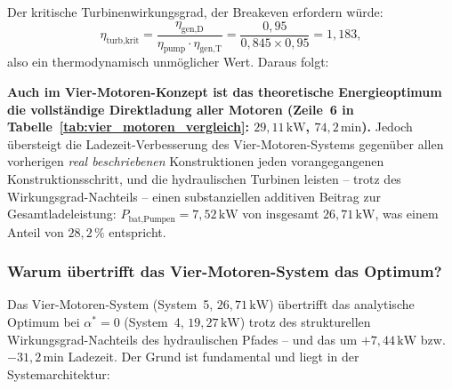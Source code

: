 ﻿\documentclass[a4paper,12pt]{article}
\begin{document}
Der kritische Turbinenwirkungsgrad, der Breakeven erfordern würde:
\begin{equation}
  \eta_\text{turb,krit}
    = \frac{\eta_\text{gen,D}}{\eta_\text{pump} \cdot \eta_\text{gen,T}}
    = \frac{0{,}95}{0{,}845 \times 0{,}95}
    = 1{,}183,
  \label{eq:eta_turb_krit_4mot}
\end{equation}
also ein thermodynamisch unmöglicher Wert. Daraus folgt:

\textbf{Auch im Vier-Motoren-Konzept ist das theoretische Energieoptimum
die vollständige Direktladung aller Motoren (Zeile~6 in
Tabelle~\ref{tab:vier_motoren_vergleich}: $29{,}11\,\text{kW}$,
$74{,}2\,\text{min}$).} Jedoch übersteigt die Ladezeit-Verbesserung
des Vier-Motoren-Systems gegenüber allen vorherigen \textit{real
beschriebenen} Konstruktionen jeden vorangegangenen Konstruktionsschritt,
und die hydraulischen Turbinen leisten -- trotz des Wirkungsgrad-Nachteils
-- einen substanziellen additiven Beitrag zur Gesamtladeleistung:
$P_\text{bat,Pumpen} = 7{,}52\,\text{kW}$ von insgesamt
$26{,}71\,\text{kW}$, was einem Anteil von $28{,}2\,\%$ entspricht.

\subsubsection{Warum übertrifft das Vier-Motoren-System das Optimum?}

Das Vier-Motoren-System (System~5, $26{,}71\,\text{kW}$) übertrifft
das analytische Optimum bei $\alpha^* = 0$
(System~4, $19{,}27\,\text{kW}$) trotz des strukturellen
Wirkungsgrad-Nachteils des hydraulischen Pfades -- und das um
$+7{,}44\,\text{kW}$ bzw.\ $-31{,}2\,\text{min}$ Ladezeit.
Der Grund ist fundamental und liegt in der Systemarchitektur:
\end{document}
